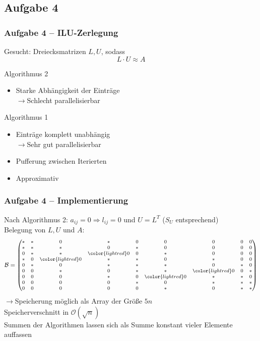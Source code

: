 \documentclass[german,notes,18pt]{beamer}
\begin{document}
	\subsection{Aufgabe 4}
	\begin{frame}
		\frametitle{Aufgabe 4 -- ILU-Zerlegung}
		
		Gesucht: Dreiecksmatrizen $L,U$, sodass
		\begin{equation*}
			L\cdot U\approx A
		\end{equation*}
		
		Algorithmus 2
		\begin{itemize}
			\item Starke Abhängigkeit der Einträge \\
			$\rightarrow$Schlecht parallelisierbar
		\end{itemize}
		Algorithmus 1
		\begin{itemize}
			\item Einträge komplett unabhängig \\
			$\rightarrow$Sehr gut parallelisierbar
			\item Pufferung zwischen Iterierten
			\item Approximativ
		\end{itemize}
	\end{frame}
	\begin{frame}
		\frametitle{Aufgabe 4 -- Implementierung}
		Nach Algorithmus 2: $a_{ij}=0\Rightarrow l_{ij}=0$ und $U=L^T$ ($S_U$ entsprechend) \\
		Belegung von $L,U$ und $A$:
		\begin{equation*}
			\footnotesize
			\mathcal{B}=\begin{pmatrix}
			* & * & 0 & * & 0 & 0 & 0 & 0 & 0 \\
			* & * & * & 0 & * & 0 & 0 & 0 & 0 \\
			0 & * & * & \color{lightred}0 & 0 & * & 0 & 0 & 0 \\
			* & 0 & \color{lightred}0 & * & * & 0 & * & 0 & 0 \\
			0 & * & 0 & * & * & * & 0 & * & 0 \\
			0 & 0 & * & 0 & * & * & \color{lightred}0 & 0 & * \\
			0 & 0 & 0 & * & 0 & \color{lightred}0 & * & * & 0 \\
			0 & 0 & 0 & 0 & * & 0 & * & * & * \\
			0 & 0 & 0 & 0 & 0 & * & 0 & * & *
			\end{pmatrix}
		\end{equation*}
		$\rightarrow$Speicherung möglich als Array der Größe $5n$ \\
		{\color{lightred}Speicherverschnitt} in $\mathcal{O}(\sqrt{n})$ \\
		\vspace{1em}
		Summen der Algorithmen lassen sich als Summe konstant vieler Elemente auffassen
	\end{frame}
\end{document}
